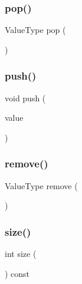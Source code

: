 \mbox{\label{classStack_a278630d7ff14886cdbc3585527e91733}} 
\subsubsection{\texorpdfstring{pop()}{pop()}}
{\footnotesize\ttfamily Value\+Type pop (\begin{DoxyParamCaption}{ }\end{DoxyParamCaption})}

\mbox{\label{classStack_a3fa54a00594a4b33b29b45c98c9f6ed4}} 
\subsubsection{\texorpdfstring{push()}{push()}}
{\footnotesize\ttfamily void push (\begin{DoxyParamCaption}\item[{const Value\+Type \&}]{value }\end{DoxyParamCaption})}

\mbox{\label{classStack_a025ec97fa5b04552f5ad0902c1f02ac1}} 
\subsubsection{\texorpdfstring{remove()}{remove()}}
{\footnotesize\ttfamily Value\+Type remove (\begin{DoxyParamCaption}{ }\end{DoxyParamCaption})}

\mbox{\label{classStack_af9593d4a5ff4274efaf429cb4f9e57cc}} 
\subsubsection{\texorpdfstring{size()}{size()}}
{\footnotesize\ttfamily int size (\begin{DoxyParamCaption}{ }\end{DoxyParamCaption}) const}

\mbox{\label{classStack_af4e7b293e5989a3737c116dbf8f4eaf2}} 

